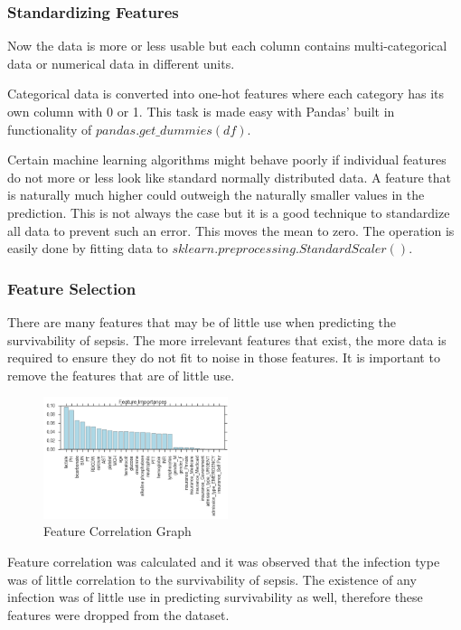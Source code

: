\documentclass[11pt]{article}
\begin{document}
		\subsubsection{Standardizing Features}
		Now the data is more or less usable but each column contains multi-categorical data or numerical data in different units.
		
		Categorical data is converted into one-hot features where each category has its own column with 0 or 1. This task is made easy with Pandas' built in functionality of \(pandas.get\_dummies(df)\).
		
		Certain machine learning algorithms might behave poorly if individual features do not more or less look like standard normally distributed data. A feature that is naturally much higher could outweigh the naturally smaller values in the prediction. This is not always the case but it is a good technique to standardize all data to prevent such an error. This moves the mean to zero. The operation is easily done by fitting data to \(sklearn.preprocessing.StandardScaler()\).
		
		\subsubsection{Feature Selection}
		There are many features that may be of little use when predicting the survivability of sepsis. The more irrelevant features that exist, the more data is required to ensure they do not fit to noise in those features. It is important to remove the features that are of little use. 
		
		\begin{figure}
			\begin{center}
				\includegraphics[width=0.48\textwidth]{feature_correlation_2.png}
			\end{center}
			\caption{Feature Correlation Graph}
		\end{figure}
		
		Feature correlation was calculated and it was observed that the infection type was of little correlation to the survivability of sepsis. The existence of any infection was of little use in predicting survivability as well, therefore these features were dropped from the dataset.
		
\end{document}
